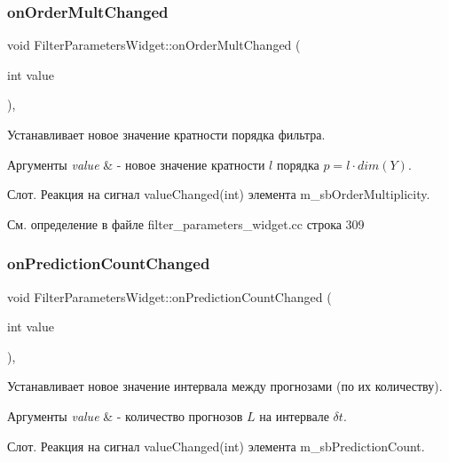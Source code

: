 \subsubsection{\texorpdfstring{on\+Order\+Mult\+Changed}{onOrderMultChanged}}
{\footnotesize\ttfamily void Filter\+Parameters\+Widget\+::on\+Order\+Mult\+Changed (\begin{DoxyParamCaption}\item[{int}]{value }\end{DoxyParamCaption})\hspace{0.3cm}{\ttfamily [private]}, {\ttfamily [slot]}}



Устанавливает новое значение кратности порядка фильтра. 


\begin{DoxyParams}{Аргументы}
{\em value} & -\/ новое значение кратности $l$ порядка $p = l\cdot dim(Y)$.\\
\hline
\end{DoxyParams}
Слот. Реакция на сигнал value\+Changed(int) элемента m\+\_\+sb\+Order\+Multiplicity. 

См. определение в файле filter\+\_\+parameters\+\_\+widget.\+cc строка 309

\hypertarget{class_filter_parameters_widget_a4c0b14d9be53fd4b45179037e09c33b3}{}\label{class_filter_parameters_widget_a4c0b14d9be53fd4b45179037e09c33b3} 
\subsubsection{\texorpdfstring{on\+Prediction\+Count\+Changed}{onPredictionCountChanged}}
{\footnotesize\ttfamily void Filter\+Parameters\+Widget\+::on\+Prediction\+Count\+Changed (\begin{DoxyParamCaption}\item[{int}]{value }\end{DoxyParamCaption})\hspace{0.3cm}{\ttfamily [private]}, {\ttfamily [slot]}}



Устанавливает новое значение интервала между прогнозами (по их количеству). 


\begin{DoxyParams}{Аргументы}
{\em value} & -\/ количество прогнозов $L$ на интервале $\delta t$.\\
\hline
\end{DoxyParams}
Слот. Реакция на сигнал value\+Changed(int) элемента m\+\_\+sb\+Prediction\+Count. 

